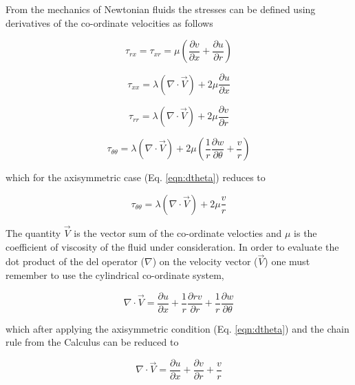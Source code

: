 	From the mechanics of Newtonian fluids the stresses can be defined using derivatives of the 
co-ordinate velocities as follows

\begin{equation}
	\tau_{rx} = \tau_{xr} = \mu(\frac{\partial v}{\partial x} + \frac{\partial u}{\partial r})
\label{eqn:taurx}
\end{equation}

\begin{equation}
	\tau_{xx} = \lambda(\nabla \cdot \vec{V}) + 2 \mu \frac{\partial u}{\partial x}
\label{eqn:tauxxlambda}
\end{equation}

\begin{equation}
	\tau_{rr} = \lambda(\nabla \cdot \vec{V}) + 2 \mu \frac{\partial v}{\partial r}
\label{eqn:taurrlambda}
\end{equation}

\begin{displaymath}
	\tau_{\theta \theta} = \lambda(\nabla \cdot \vec{V}) + 2 \mu (\frac{1}{r} \frac{\partial w}{\partial \theta} + \frac{v}{r})
\end{displaymath}

	which for the axisymmetric case (Eq. \ref{eqn:dtheta}) reduces to 

\begin{equation}
	\tau_{\theta \theta} = \lambda(\nabla \cdot \vec{V}) + 2 \mu \frac{v}{r}	
\label{eqn:tauthetathetalambda}
\end{equation}
	
	The quantity $\vec{V}$ is the vector sum of the co-ordinate velocties and $\mu$ is the coefficient of 
viscosity of the fluid under consideration.  In order to evaluate the dot product of the del operator ($\nabla$) on 
the velocity vector ($\vec{V}$) one must remember to use the cylindrical co-ordinate system,

\begin{displaymath}
	\nabla \cdot \vec{V} = \frac{\partial u}{\partial x} + \frac{1}{r} \frac{\partial rv}{\partial r} + \frac{1}{r}
	\frac{\partial w}{\partial \theta}
\end{displaymath}

	which after applying the axisymmetric condition (Eq. \ref{eqn:dtheta}) and the chain rule from the Calculus
can be reduced to

\begin{equation}
	\nabla \cdot \vec{V} = \frac{\partial u}{\partial x} +  \frac{\partial v}{\partial r} + \frac{v}{r}
\label{eqn:delv}
\end{equation}

